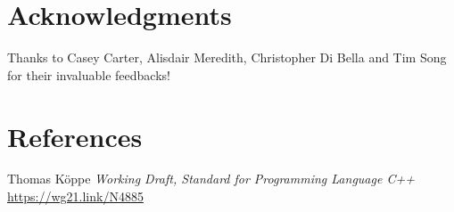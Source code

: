 \documentclass{wg21}
\begin{document}
\section{Acknowledgments}

Thanks to Casey Carter, Alisdair Meredith, Christopher Di Bella and Tim Song for their invaluable feedbacks!

\section{References}
\renewcommand{\section}[2]{}%



\begin{thebibliography}{9}

Thomas Köppe
\emph{Working Draft, Standard for Programming Language C++}\newline
\url{https://wg21.link/N4885}


\end{thebibliography}
\end{document}
